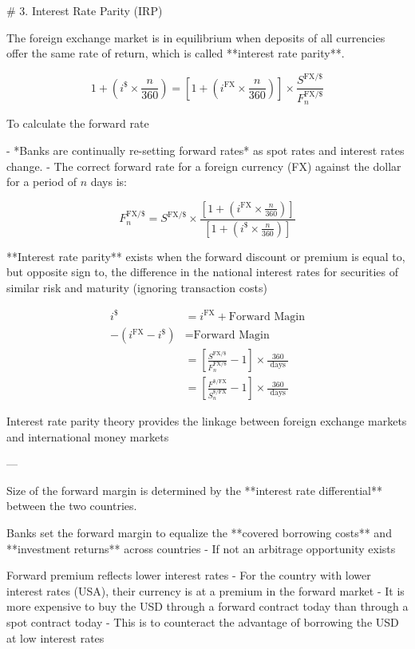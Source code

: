 \documentclass{article}
\begin{document}
# 3. Interest Rate Parity (IRP)

The foreign exchange market is in equilibrium when deposits of all currencies offer the same rate of return, which is called **interest rate parity**.

$$
1+\left(i^{\$} \times \frac{n}{360}\right) = \left[1+\left(i^{\text{FX}} \times \frac{n}{360}\right)\right] \times \frac{S^{\text{FX/\$}}}{F_{n}^{\text{FX/\$}}}
$$

To calculate the forward rate

- *Banks are continually re-setting forward rates* as spot rates and interest rates change.
- The correct forward rate for a foreign currency (FX) against the dollar for a period of $ n $ days is:

$$
F_{n}^{\text{FX/\$}}=S^{\text{FX/\$}} \times \frac{\left[1+\left(i^{\text{FX}} \times \frac{n}{360}\right)\right]}{\left[1+\left(i^{\$} \times \frac{n}{360}\right)\right]}
$$

**Interest rate parity** exists when the forward discount or premium is equal to, but opposite sign to, the difference in the national interest rates for securities of similar risk and maturity (ignoring transaction costs)

$$
\begin{aligned}
i^{\$} &= i^{\text{FX}} + \text{Forward Magin}
\\
-(i^{\text{FX}} - i^{\$}) & =   \text{Forward Magin} 
\\
&=  \left[\frac{S^{\text{FX/\$}}}{F_{n}^{\text{FX/\$}}}-1 \right] \times \frac{360}{\text { days }} \\
&=  \left[\frac{F^{\text{\$/FX}}}{S_{n}^{\text{\$/FX}}}-1 \right] \times \frac{360}{\text { days }}
\end{aligned}
$$


Interest rate parity theory provides the linkage between foreign exchange markets and international money markets

---

Size of the forward margin is determined by the **interest rate differential** between the two countries.

Banks set the forward margin to equalize the **covered borrowing costs** and **investment returns** across countries
- If not an arbitrage opportunity exists


Forward premium reflects lower interest rates
- For the country with lower interest rates (USA), their currency is at a premium in the forward market
- It is more expensive to buy the USD through a forward contract today than through a spot contract today
- This is to counteract the advantage of borrowing the USD at low interest rates
\end{document}
